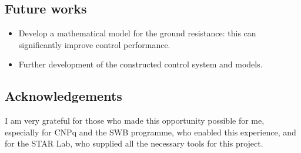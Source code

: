 \documentclass[final]{beamer}
\begin{document}
\begin{frame}[t]{}
\begin{multicols}{3}
			\subsection{Future works}
			\begin{itemize}
				\item Develop a mathematical model for the ground resistance: this can significantly improve control performance.
				\item Further development of the constructed control system and models.
			\end{itemize}
			
			\subsection{Acknowledgements}
			I am very grateful for those who made this opportunity possible for me,
			especially for CNPq and the SWB programme, who enabled this experience, and
			for the STAR Lab, who supplied all the necessary tools for this project.
			
		\end{multicols}
	\end{frame}
\end{document}
